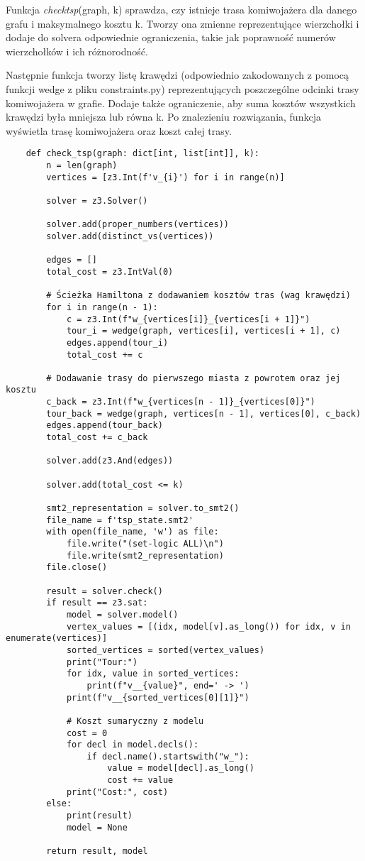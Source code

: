 Funkcja \textit{check\textunderscore tsp}(graph, k) sprawdza, czy istnieje trasa komiwojażera dla danego grafu i maksymalnego kosztu k. Tworzy ona zmienne reprezentujące wierzchołki i dodaje do solvera odpowiednie ograniczenia, takie jak poprawność numerów wierzchołków i ich różnorodność.

Następnie funkcja tworzy listę krawędzi (odpowiednio zakodowanych z pomocą funkcji wedge z pliku constraints.py) reprezentujących poszczególne odcinki trasy komiwojażera w grafie. Dodaje także ograniczenie, aby suma kosztów wszystkich krawędzi była mniejsza lub równa k. Po znalezieniu rozwiązania, funkcja wyświetla trasę komiwojażera oraz koszt całej trasy.

\begin{lstlisting}
	def check_tsp(graph: dict[int, list[int]], k):
		n = len(graph)
		vertices = [z3.Int(f'v_{i}') for i in range(n)]
		
		solver = z3.Solver()
		
		solver.add(proper_numbers(vertices))
		solver.add(distinct_vs(vertices))
		
		edges = []
		total_cost = z3.IntVal(0)
		
		# Ścieżka Hamiltona z dodawaniem kosztów tras (wag krawędzi)
		for i in range(n - 1):
			c = z3.Int(f"w_{vertices[i]}_{vertices[i + 1]}")
			tour_i = wedge(graph, vertices[i], vertices[i + 1], c)
			edges.append(tour_i)
			total_cost += c
		
		# Dodawanie trasy do pierwszego miasta z powrotem oraz jej kosztu
		c_back = z3.Int(f"w_{vertices[n - 1]}_{vertices[0]}")
		tour_back = wedge(graph, vertices[n - 1], vertices[0], c_back)
		edges.append(tour_back)
		total_cost += c_back
		
		solver.add(z3.And(edges))
		
		solver.add(total_cost <= k)
		
		smt2_representation = solver.to_smt2()
		file_name = f'tsp_state.smt2'
		with open(file_name, 'w') as file:
			file.write("(set-logic ALL)\n")
			file.write(smt2_representation)  
		file.close()
		
		result = solver.check()
		if result == z3.sat:
			model = solver.model()
			vertex_values = [(idx, model[v].as_long()) for idx, v in enumerate(vertices)]
			sorted_vertices = sorted(vertex_values)
			print("Tour:")
			for idx, value in sorted_vertices:
				print(f"v__{value}", end=' -> ')
			print(f"v__{sorted_vertices[0][1]}")
			
			# Koszt sumaryczny z modelu
			cost = 0
			for decl in model.decls():
				if decl.name().startswith("w_"):
					value = model[decl].as_long()
					cost += value
			print("Cost:", cost)
		else:
			print(result)
			model = None
			
		return result, model
\end{lstlisting}

